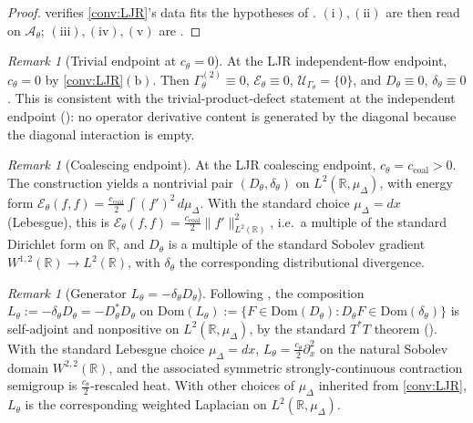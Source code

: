 \documentclass[11pt,reqno]{amsart}
\theoremstyle{plain}
\theoremstyle{definition}
\theoremstyle{remark}
\newtheorem{remark}[theorem]{Remark}
\newcommand{\R}{\mathbb{R}}
\newcommand{\Dom}{\mathrm{Dom}}
\newcommand{\cA}{\mathcal A}
\newcommand{\cE}{\mathcal E}
\newcommand{\cU}{\mathcal U}
\newcommand{\Dth}{D_{\theta}}
\newcommand{\divth}{\delta_{\theta}}
\begin{document}
\begin{proof}
 verifies \cref{conv:LJR}'s data fits the
hypotheses of \cite[Ass.~2.4]{GammaHierarchyDivergence}.
$(\mathrm i),(\mathrm{ii})$ are then
\cite[Thm.~A]{GammaHierarchyDivergence} read on $\cA_{\theta}$;
$(\mathrm{iii}),(\mathrm{iv}),(\mathrm v)$ are
\cite[Thm.~B]{GammaHierarchyDivergence}.
\end{proof}

\begin{remark}[Trivial endpoint at $c_{\theta}=0$]\label{rem:trivial-endpoint}
At the LJR independent-flow endpoint, $c_{\theta}=0$ by
\cref{conv:LJR}$(\mathrm b)$. Then
$\Gamma^{(2)}_{\theta}\equiv 0$, $\cE_{\theta}\equiv 0$,
$\cU_{\Gamma_{\theta}}=\{0\}$, and $\Dth\equiv 0$,
$\divth\equiv 0$. This is consistent with the
trivial-product-defect statement at the independent endpoint
(\cite[Prop.~6.5]{PrimitiveDivergence}): no operator derivative
content is generated by the diagonal because the diagonal
interaction is empty.
\end{remark}

\begin{remark}[Coalescing endpoint]\label{rem:coalescing-endpoint}
At the LJR coalescing endpoint, $c_{\theta}=c_{\mathrm{coal}}>0$.
The construction yields a nontrivial pair
$(\Dth,\divth)$ on $L^{2}(\R,\mu_{\Delta})$, with energy form
$\cE_{\theta}(f,f)=\frac{c_{\mathrm{coal}}}{2}\int(f')^{2}\,d\mu_{\Delta}$.
With the standard choice $\mu_{\Delta}=dx$ (Lebesgue), this is
$\cE_{\theta}(f,f)=\frac{c_{\mathrm{coal}}}{2}\|f'\|_{L^{2}(\R)}^{2}$,
i.e.\ a multiple of the standard Dirichlet form on $\R$, and
$\Dth$ is a multiple of the standard Sobolev gradient
$W^{1,2}(\R)\to L^{2}(\R)$, with $\divth$ the corresponding
distributional divergence.
\end{remark}

\begin{remark}[Generator $L_{\theta}=-\divth\Dth$]\label{rem:Ltheta}
Following \cite[Rem.~4.10]{GammaHierarchyDivergence}, the
composition
$L_{\theta}:=-\divth\Dth=-\Dth^{*}\Dth$ on
$\Dom(L_{\theta}):=\{F\in\Dom(\Dth):\Dth F\in\Dom(\divth)\}$
is self-adjoint and nonpositive on $L^{2}(\R,\mu_{\Delta})$, by
the standard $T^{*}T$ theorem
(\cite[Thm.~13.13]{Rudin-FA}). With the standard Lebesgue
choice $\mu_{\Delta}=dx$, $L_{\theta}=\frac{c_{\theta}}{2}\partial_{x}^{2}$
on the natural Sobolev domain $W^{2,2}(\R)$, and the associated
symmetric strongly-continuous contraction semigroup is
$\frac{c_{\theta}}{2}$-rescaled heat. With other choices of
$\mu_{\Delta}$ inherited from \cref{conv:LJR}, $L_{\theta}$ is
the corresponding weighted Laplacian on $L^{2}(\R,\mu_{\Delta})$.
\end{remark}
\end{document}
